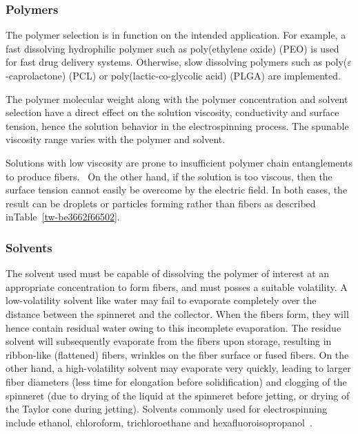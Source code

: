 \subsubsection{Polymers}The polymer selection is in function on the intended application. For example, a fast dissolving hydrophilic polymer such as poly(ethylene oxide) (PEO) is used for fast drug delivery systems. Otherwise, slow dissolving polymers such as poly($\varepsilon $-caprolactone) (PCL) or poly(lactic-co-glycolic acid) (PLGA) are implemented. \unskip~\cite{527120:13082763}

The polymer molecular weight along with the polymer concentration and solvent selection have a direct effect on the solution viscosity, conductivity and surface tension, hence the solution behavior in the electrospinning process. The spunable viscosity range varies with the polymer and solvent. 

Solutions with low viscosity are prone to insufficient polymer chain entanglements to produce fibers.\unskip~\cite{527120:13082763} On the other hand, if the solution is too viscous, then the surface tension cannot easily be overcome by the electric field. In both cases, the result can be droplets or particles forming rather than fibers as described inTable~\ref{tw-be3662f66502}.



\subsubsection{Solvents}The solvent used must be capable of dissolving the polymer of interest at an appropriate concentration to form fibers, and must posses a suitable volatility. A low-volatility solvent like water may fail to evaporate completely over the distance between the spinneret and the collector. When the fibers form, they will hence contain residual water owing to this incomplete evaporation. The residue solvent will subsequently evaporate from the fibers upon storage, resulting in ribbon-like (flattened) fibers, wrinkles on the fiber surface or fused fibers. On the other hand, a high-volatility solvent may evaporate very quickly, leading to larger fiber diameters (less time for elongation before solidification) and clogging of the spinneret (due to drying of the liquid at the spinneret before jetting, or drying of the Taylor cone during jetting). Solvents commonly used for electrospinning include ethanol, chloroform, trichloroethane and hexafluoroisopropanol\unskip~\cite{527120:12073495,527120:16887323,527120:16887324}.

